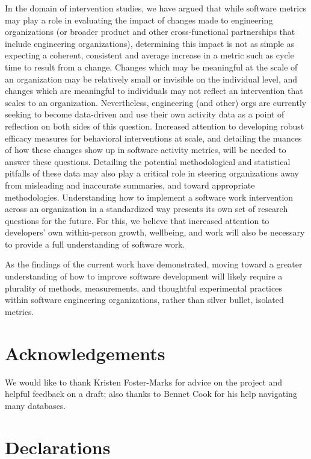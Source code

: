 \documentclass[
]{article}
\begin{document}
In the domain of intervention studies, we have argued that while
software metrics may play a role in evaluating the impact of changes
made to engineering organizations (or broader product and other
cross-functional partnerships that include engineering organizations),
determining this impact is not as simple as expecting a coherent,
consistent and average increase in a metric such as cycle time to result
from a change. Changes which may be meaningful at the scale of an
organization may be relatively small or invisible on the individual
level, and changes which are meaningful to individuals may not reflect
an intervention that scales to an organization. Nevertheless,
engineering (and other) orgs are currently seeking to become data-driven
and use their own activity data as a point of reflection on both sides
of this question. Increased attention to developing robust efficacy
measures for behavioral interventions at scale, and detailing the
nuances of how these changes show up in software activity metrics, will
be needed to answer these questions. Detailing the potential
methodological and statistical pitfalls of these data may also play a
critical role in steering organizations away from misleading and
inaccurate summaries, and toward appropriate methodologies.
Understanding how to implement a software work intervention across an
organization in a standardized way presents its own set of research
questions for the future. For this, we believe that increased attention
to developers' own within-person growth, wellbeing, and work will also
be necessary to provide a full understanding of software work.

As the findings of the current work have demonstrated, moving toward a
greater understanding of how to improve software development will likely
require a plurality of methods, measurements, and thoughtful
experimental practices within software engineering organizations, rather
than silver bullet, isolated metrics.

\section{Acknowledgements}\label{acknowledgements}

We would like to thank Kristen Foster-Marks for advice on the project
and helpful feedback on a draft; also thanks to Bennet Cook for his help
navigating many databases.

\section{Declarations}\label{declarations}
\end{document}

